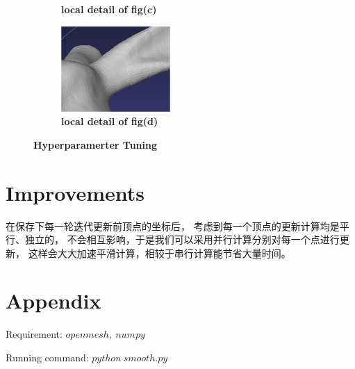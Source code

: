 \documentclass{ctexart}
\begin{document}
\begin{figure}[htbp]
\begin{subfigure}[htbp]{0.24\linewidth}
        \caption{\textbf{local detail of fig(c)}}
    \end{subfigure}
    \begin{subfigure}[htbp]{0.24\linewidth}
        \centering
        \includegraphics[width=0.9\linewidth]{figures/detail_1-20.png}
        \caption{\textbf{local detail of fig(d)}}
    \end{subfigure}
    \caption{\textbf{Hyperparamerter Tuning}}
\end{figure}

\section{Improvements}
在保存下每一轮迭代更新前顶点的坐标后，
考虑到每一个顶点的更新计算均是平行、独立的，
不会相互影响，于是我们可以采用并行计算分别对每一个点进行更新，
这样会大大加速平滑计算，相较于串行计算能节省大量时间。

\appendix
\section{Appendix}
Requirement: $openmesh,\ numpy$

Running command: $python\ smooth.py$
\end{document}
